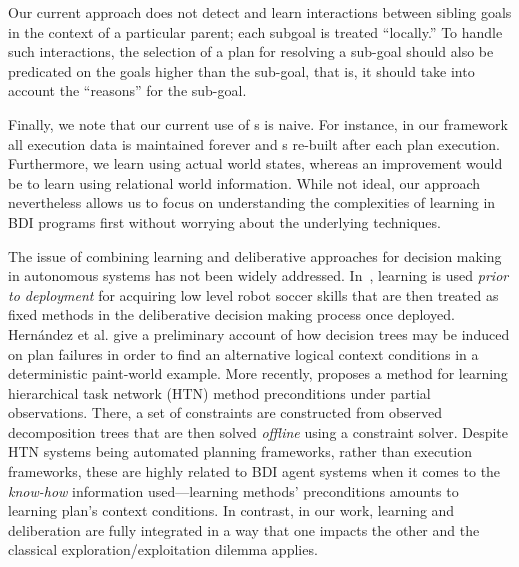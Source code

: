 %
Our current approach does not detect and learn interactions between
sibling goals in the context of a particular parent; each
subgoal is treated ``locally.'' To handle such interactions, the
selection of a plan for resolving a sub-goal should also be predicated
on the goals higher than the sub-goal, that is, it should take into
account the ``reasons'' for the sub-goal.


Finally, we note that our current use of \dt s is naive. 
For instance, in our framework all execution data is maintained forever and 
\dt s re-built after each plan execution. Furthermore, we learn using actual 
world states, whereas an improvement would be to learn using relational world information.
While not ideal, our approach nevertheless allows us to focus on 
understanding the complexities of learning in BDI programs first 
without worrying about the underlying techniques.

The issue of combining learning and deliberative approaches for decision making
in autonomous systems has not been widely addressed.
In~\cite{Riedmiller01}, learning is used \emph{prior to deployment}
for acquiring low level robot soccer skills that are then treated as
fixed methods in the deliberative decision making process once deployed.
Hern\'andez et al. \cite{Hernandez04:Learning} give a preliminary
account of how decision trees may be induced on plan failures in order
to find an alternative logical context conditions in a deterministic
paint-world example. 
More recently, \cite{Zhuo09:Learning} proposes a method for learning
hierarchical task network (HTN) method preconditions under partial
observations. There, a set of  constraints are constructed from
observed decomposition trees that are then solved \emph{offline} using
a constraint solver. Despite HTN systems being automated planning
frameworks, rather than execution frameworks, these are highly 
related to BDI agent systems when it comes to the \emph{know-how} information
used---learning methods' preconditions amounts to learning plan's context
conditions.
In contrast, in our work, learning and deliberation are fully integrated in a
way that one impacts the other and the classical
exploration/exploitation dilemma applies. 

